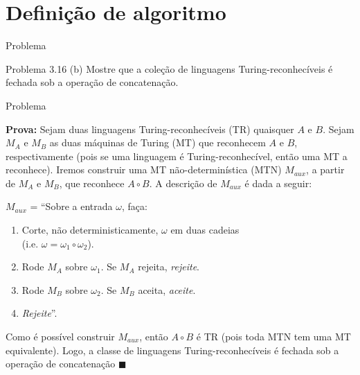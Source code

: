\documentclass[xcolor=dvipsnames,table]{beamer}
\begin{document}
	\section{Definição de algoritmo}
	\begin{frame}{Problema}
		\begin{block}{Problema 3.16 (b)}
			Mostre que a coleção de linguagens Turing-reconhecíveis é fechada sob a operação de concatenação.		
		\end{block}
	\end{frame}
	
	\begin{frame}{Problema} 
		
		{\bf Prova:} Sejam duas linguagens Turing-reconhecíveis (TR) quaisquer $A$ e $B$. \pause Sejam $M_A$ e $M_B$ as duas máquinas de Turing (MT) que reconhecem $A$ e $B$, respectivamente \pause (pois se uma linguagem é Turing-reconhecível, então uma MT a reconhece). \pause Iremos construir uma MT não-determinística (MTN) $M_{aux}$, a partir de $M_A$ e $M_B$, que reconhece $A \circ B$. \pause A descrição de $M_{aux}$ é dada a seguir: \pause
		
		$M_{aux}$ = ``Sobre a entrada $\omega$, faça: \pause
		\begin{enumerate}
			\item Corte, não deterministicamente, $\omega$ em duas cadeias \\(i.e. $\omega = \omega_1 \circ \omega_2$). \pause
			\item Rode $M_A$ sobre $\omega_1$. Se $M_A$ rejeita, {\it rejeite}. \pause
			\item Rode $M_B$ sobre $\omega_2$. Se $M_B$ aceita, {\it aceite}. \pause
			\item {\it Rejeite}''.
		\end{enumerate} \pause
		
		Como é possível construir $M_{aux}$, então $A \circ B$ é TR \pause (pois toda MTN tem uma MT equivalente). \pause Logo, a classe de linguagens Turing-reconhecíveis é fechada sob a operação de concatenação $\blacksquare$
	\end{frame}
	
\end{document}

